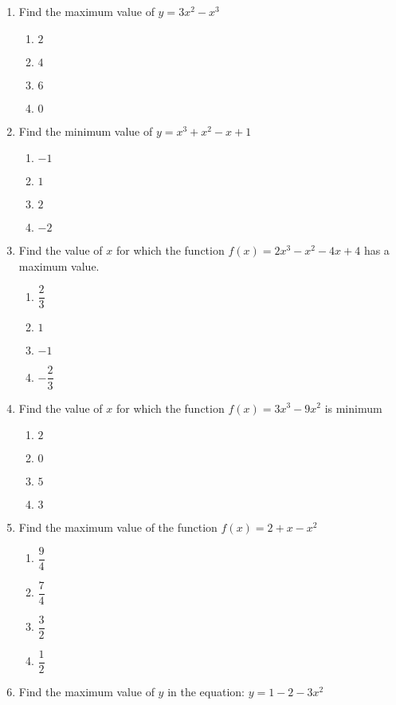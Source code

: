 \begin{multicols}{2}
\begin{enumerate}[label={\arabic*.}]
\item Find the maximum value of \(y = 3{x}^{2} - {x}^{3}\)
	\begin{enumerate}[label={\Alph*.}]
		\item \(2\)
		\item \(4\)
		\item \(6\)
		\item \(0\)
	\end{enumerate}
\item Find the minimum value of \(y = {x}^{3} + {x}^{2} - x + 1\)
	\begin{enumerate}[label={\Alph*.}]
		\item \(-1\)
		\item \(1\)
		\item \(2\)
		\item \(-2\)
	\end{enumerate}
\item Find the value of \(x\) for which the function \(f(x) = 2{x}^{3} - {x}^{2} -4x + 4\) has a maximum value.
	\begin{enumerate}[label={\Alph*.}]
		\item \(\dfrac{2}{3}\)
		\item \(1\)
		\item \(-1\)
		\item \(-\dfrac{2}{3}\)
	\end{enumerate}
\item Find the value of \(x\) for which the function \(f(x) = 3{x}^{3}-9{x}^{2}\) is minimum
	\begin{enumerate}[label={\Alph*.}]
		\item \(2\)
		\item \(0\)
		\item \(5\)
		\item \(3\)
	\end{enumerate}
\item Find the maximum value of the function \(f(x) = 2 + x - {x}^{2}\)
	\begin{enumerate}[label={\Alph*.}]
		\item \(\dfrac{9}{4}\)
		\item \(\dfrac{7}{4}\)
		\item \(\dfrac{3}{2}\)
		\item \(\dfrac{1}{2}\)
	\end{enumerate}
\item Find the maximum value of \(y\) in the equation: \(y = 1 - 2 - 3{x}^{2}\)
	\begin{enumerate}[label={\Alph*.}]

\end{enumerate}
\end{enumerate}
\end{multicols}
